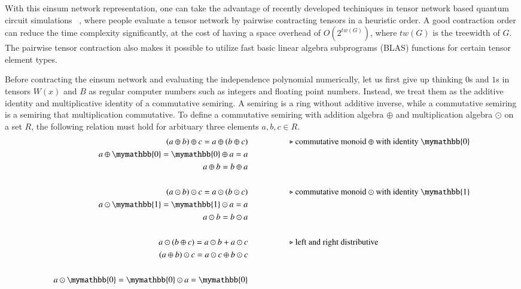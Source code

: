 \documentclass{article}
\newcommand{\<}{\langle}
\renewcommand{\>}{\rangle}
\renewcommand{\cite}[1]{{\citep{#1}}}
\theoremstyle{definition}\newtheorem{definition}{\textit{Definition}}
\begin{document}
With this einsum network representation, one can take the advantage of recently developed techiniques in tensor network based quantum circuit simulations ~\cite{Gray2021,Pan2021},
where people evaluate a tensor network by pairwise contracting tensors in a heuristic order.
A good contraction order can reduce the time complexity significantly, at the cost of having a space overhead of $O(2^{tw(G)})$, where $tw(G)$ is the treewidth of $G$.~\cite{Markov2008}
The pairwise tensor contraction also makes it possible to utilize fast basic linear algebra subprograms (BLAS) functions for certain tensor element types.

Before contracting the einsum network and evaluating the independence polynomial numerically, let us first give up thinking $0$s and $1$s in tensors $W(x)$ and $B$ as regular computer numbers such as integers and floating point numbers.
Instead, we treat them as the additive identity and multiplicative identity of a commutative semiring.
A semiring is a ring without additive inverse, while a commutative semiring is a semiring that multiplication commutative.
To define a commutative semiring with addition algebra $\oplus$ and multiplication algebra $\odot$ on a set $R$, the following relation must hold for arbituary three elements $a, b, c \in R$.
\begin{align*}
(a \oplus b) \oplus c = a \oplus (b \oplus c) & \hspace{5em}\text{$\triangleright$ commutative monoid $\oplus$ with identity $\mymathbb{0}$}\\
a \oplus \mymathbb{0} = \mymathbb{0} \oplus a = a &\\
a \oplus b = b \oplus a &\\
&\\
(a \odot b) \odot c = a \odot (b \odot c)  &   \hspace{5em}\text{$\triangleright$ commutative monoid $\odot$ with identity $\mymathbb{1}$}\\
a \odot  \mymathbb{1} =  \mymathbb{1} \odot a = a &\\
a \odot b = b \odot a &\\
&\\
a \odot (b\oplus c) = a\odot b + a\odot c  &  \hspace{5em}\text{$\triangleright$ left and right distributive}\\
(a\oplus b) \odot c = a\odot c \oplus b\odot c &\\
&\\
a \odot \mymathbb{0} = \mymathbb{0} \odot a = \mymathbb{0}
\end{align*}
\end{document}
